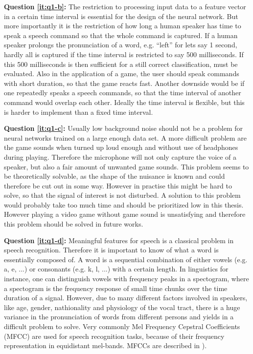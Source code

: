 \textbf{Question \ref{it:q1-b}:} 
The restriction to processing input data to a feature vector in a certain time interval is essential for the design of the neural network.
But more importantly it is the restriction of how long a human speaker has time to speak a speech command so that the whole command is captured. If a human speaker prolongs the pronunciation of a word, e.g. \enquote{left} for lets say 1 second, hardly all is captured if the time interval is restricted to say 500 milliseconds. If this 500 milliseconds is then sufficient for a still correct classification, must be evaluated. 
Also in the application of a game, the user should speak commands with short duration, so that the game reacts fast. Another downside would be if one repeatedly speaks a speech commands, so that the time interval of another command would overlap each other. Ideally the time interval is flexible, but this is harder to implement than a fixed time interval.

\textbf{Question \ref{it:q1-c}:}
Usually low background noise should not be a problem for neural networks trained on a large enough data set. 
A more difficult problem are the game sounds when turned up loud enough and without use of headphones during playing. 
Therefore the microphone will not only capture the voice of a speaker, but also a fair amount of unwanted game sounds. 
This problem seems to be theoretically solvable, as the shape of the nuisance is known and could therefore be cut out in some way. 
However in practise this might be hard to solve, so that the signal of interest is not disturbed. 
A solution to this problem would probably take too much time and should be prioritized low in this thesis. 
However playing a video game without game sound is unsatisfying and therefore this problem should be solved in future works.

\textbf{Question \ref{it:q1-d}:} 
Meaningful features for speech is a classical problem in speech recognition.
Therefore it is important to know of what a word is essentially composed of. 
A word is a sequential combination of either vowels (e.g. a, e, ...) or consonants (e.g. k, l, ...) with a certain length. 
In linguistics for instance, one can distinguish vowels with frequency peaks in a spectogram, where a spectogram is the frequency response of small time chunks over the time duration of a signal. 
However, due to many different factors involved in speakers, like age, gender, nathionality and physiology of the vocal tract, there is a huge variance in the pronunciation of words from different persons and yields in a difficult problem to solve. 
Very commonly Mel Frequency Cepstral Coefficients (MFCC) are used for speech recognition tasks, because of their frequency representation in equidistant mel-bands.
MFCCs are described in ).


